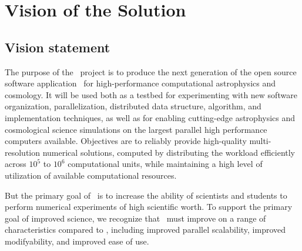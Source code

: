 \documentclass[11pt]{article}
\begin{document}
\section{Vision of the Solution}

\subsection{Vision statement}



    The purpose of the \cello\ project is to produce the next
    generation of the open source software application \enzo\ for
    high-performance computational astrophysics and cosmology.  It
    will be used both as a testbed for experimenting with new software
    organization, parallelization, distributed data structure,
    algorithm, and implementation techniques, as well as for enabling
    cutting-edge astrophysics and cosmological science simulations on
    the largest parallel high performance computers available.
    Objectives are to reliably provide high-quality multi-resolution
    numerical solutions, computed by distributing the workload
    efficiently across $10^5$ to $10^6$ computational units, while
    maintaining a high level of utilization of available computational
    resources.


    But the primary goal of \cello\ is to increase the ability of
    scientists and students
    to perform numerical experiments of high scientific worth.
    To support the primary goal of improved science, we recognize that
    \cello\ must improve on a range of characteristics compared to
    \enzo, including 
%
    improved parallel scalability,
    improved modifyability, 
    and improved ease of use.
\end{document}
